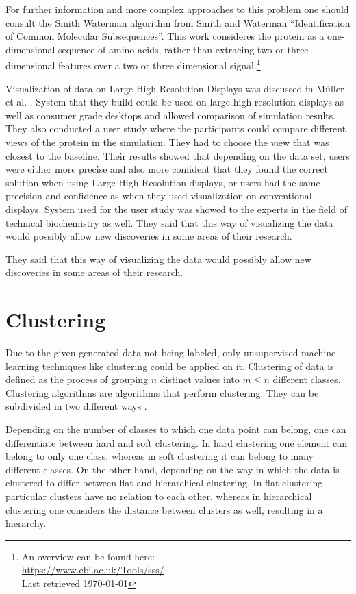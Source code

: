 \documentclass[journal]{vgtc}       %
\newcommand{\todo}[1]{\textcolor{red}{\textbf{TODO:} #1}}
\begin{document}
For further information and more complex approaches to this problem one should consult the Smith Waterman algorithm from Smith and Waterman ``Identification of Common Molecular Subsequences''\cite{smithwater}. This work consideres the protein as a one-dimensional sequence of amino acids, rather than extracing two or three dimensional features over a two or three dimensional signal.\footnote{An overview can be found here: \\ \url{https://www.ebi.ac.uk/Tools/sss/}\\ Last retrieved \today}

Visualization of data on Large High-Resolution Displays was discussed in Müller et al. \cite{powerwall}. System that they build could be used on large high-resolution displays as well as consumer grade desktops and allowed comparison of simulation results. They also conducted a user study where the participants could compare different views of the protein in the simulation. They had to choose the view that was closest to the baseline. Their results showed that depending on the data set, users were either more precise and also more confident that they found the correct solution when using Large High-Resolution displays, or users had the same precision and confidence as when they used visualization on conventional displays. System used for the user study was showed to the experts in the field of technical biochemistry as well. They said that this way of visualizing the data would possibly allow new discoveries in some areas of their research.

They said that this way of visualizing the data would possibly allow new discoveries in some areas of their research.

\section{Clustering}

Due to the given generated data  not being  labeled, only unsupervised machine learning techniques like clustering could be applied on it. 
Clustering of data is defined as the process of grouping $n$ distinct values into $m \leq n$ different classes. Clustering algorithms are algorithms that perform clustering. They can be subdivided in two different ways \cite{iir}.

Depending on the number of classes to which one data point can belong, one can differentiate  between hard and soft clustering. In hard clustering one element can belong to only one class, whereas in soft clustering it can belong to many different classes.
On the other hand, depending on the way in which the data is clustered to  differ between flat and hierarchical clustering. In flat clustering particular clusters have no relation to each other, whereas in hierarchical clustering one considers the distance between clusters as well, resulting in a hierarchy.
\end{document}
